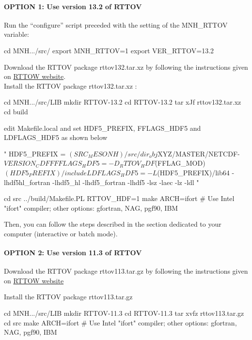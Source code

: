 \paragraph{OPTION 1: Use version 13.2 of RTTOV}

Run the ``configure'' script preceded with the setting of the MNH\_RTTOV variable:
\begin{bashcode}
cd MNH.../src/
export MNH_RTTOV=1
export VER_RTTOV=13.2
\end{bashcode}

Download the RTTOV package rttov132.tar.xz by following the instructions given on \href{https://nwpsaf.eu/site/software/rttov/}{RTTOW website}. \\

Install the RTTOV package rttov132.tar.xz :
\begin{bashcode}
cd MNH.../src/LIB
mkdir RTTOV-13.2
cd RTTOV-13.2
tar xJf rttov132.tar.xz
cd build
\end{bashcode}

edit Makefile.local and set HDF5\_PREFIX, FFLAGS\_HDF5 and LDFLAGS\_HDF5 as shown below
\begin{fortrancode}
"
HDF5_PREFIX  = $(SRC_MESONH)/src/dir_obj${XYZ}/MASTER/NETCDF-${VERSION_CDFF}
FFLAGS_HDF5  = -D_RTTOV_HDF $(FFLAG_MOD)$(HDF5_PREFIX)/include
LDFLAGS_HDF5 = -L$(HDF5_PREFIX)/lib64 -lhdf5hl_fortran -lhdf5_hl -lhdf5_fortran -lhdf5 -lsz -laec -lz -ldl
"
\end{fortrancode}

\begin{bashcode}
cd src
../build/Makefile.PL RTTOV_HDF=1
make ARCH=ifort        # Use Intel "ifort" compiler; other options: gfortran, NAG, pgf90, IBM
\end{bashcode}

Then, you can follow the steps described in the section dedicated to your computer (interactive or batch mode).

\paragraph{OPTION 2: Use version 11.3 of RTTOV}

Download the RTTOV package rttov113.tar.gz by following the instructions given on \href{https://nwpsaf.eu/site/software/rttov/}{RTTOW website}


Install the RTTOV package rttov113.tar.gz
\begin{bashcode}
cd MNH.../src/LIB
mkdir RTTOV-11.3
cd RTTOV-11.3
tar xvfz rttov113.tar.gz
cd src
make ARCH=ifort        # Use Intel "ifort" compiler; other options: gfortran, NAG, pgf90, IBM
\end{bashcode}

